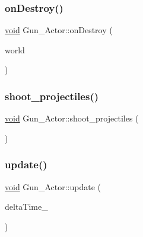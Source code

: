\mbox{\label{classGun__Actor_a75a41d18a0217acbc38bc65c4578d33c}} 
\subsubsection{\texorpdfstring{on\+Destroy()}{onDestroy()}}
{\footnotesize\ttfamily \hyperlink{imgui__impl__opengl3__loader_8h_ac668e7cffd9e2e9cfee428b9b2f34fa7}{void} Gun\+\_\+\+Actor\+::on\+Destroy (\begin{DoxyParamCaption}\item[{b2\+World \&}]{world }\end{DoxyParamCaption})}

\mbox{\label{classGun__Actor_aa28e6b811ff8d9348693c01baba1c513}} 
\subsubsection{\texorpdfstring{shoot\+\_\+projectiles()}{shoot\_projectiles()}}
{\footnotesize\ttfamily \hyperlink{imgui__impl__opengl3__loader_8h_ac668e7cffd9e2e9cfee428b9b2f34fa7}{void} Gun\+\_\+\+Actor\+::shoot\+\_\+projectiles (\begin{DoxyParamCaption}{ }\end{DoxyParamCaption})}

\mbox{\label{classGun__Actor_ab5e7b6b7032e1f0353c6c4f08cedebec}} 
\subsubsection{\texorpdfstring{update()}{update()}}
{\footnotesize\ttfamily \hyperlink{imgui__impl__opengl3__loader_8h_ac668e7cffd9e2e9cfee428b9b2f34fa7}{void} Gun\+\_\+\+Actor\+::update (\begin{DoxyParamCaption}\item[{const float}]{delta\+Time\+\_\+ }\end{DoxyParamCaption})\hspace{0.3cm}{\ttfamily [virtual]}}



